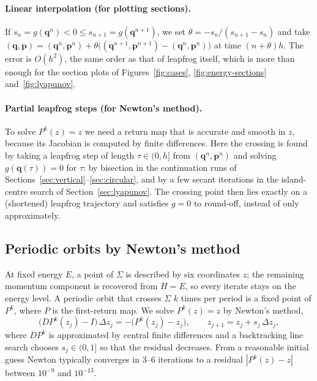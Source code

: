 \documentclass[11pt,a4paper]{article}
\newcommand{\q}{\mathbf{q}}
\newcommand{\p}{\mathbf{p}}
\begin{document}
\paragraph{Linear interpolation (for plotting sections).}
If $s_n=g(\q^n)<0\le s_{n+1}=g(\q^{n+1})$, we set
$\theta=-s_n/(s_{n+1}-s_n)$ and take
$(\q,\p)=(\q^n,\p^n)+\theta\bigl((\q^{n+1},\p^{n+1})-(\q^n,\p^n)\bigr)$ at time
$(n+\theta)h$. The error is $O(h^2)$, the same order as that of leapfrog
itself, which is more than enough for the section plots of
Figures~\ref{fig:cases}, \ref{fig:energy-sections} and~\ref{fig:lyapunov}.

\paragraph{Partial leapfrog steps (for Newton's method).}
To solve $P^k(z)=z$ we need a return map that is accurate and smooth in $z$,
because its Jacobian is computed by finite differences. Here the crossing is
found by taking a leapfrog step of length $\tau\in(0,h]$ from $(\q^n,\p^n)$
and solving $g(\q(\tau))=0$ for $\tau$: by bisection in the continuation runs
of Sections~\ref{sec:vertical}--\ref{sec:circular}, and by a few secant
iterations in the island-centre search of Section~\ref{sec:lyapunov}. The
crossing point then lies exactly on a (shortened) leapfrog trajectory and
satisfies $g=0$ to round-off, instead of only approximately.

\subsection{Periodic orbits by Newton's method}\label{sec:newton}
At fixed energy $E$, a point of $\Sigma$ is described by six coordinates $z$;
the remaining momentum component is recovered from $H=E$, so every iterate
stays on the energy level. A periodic orbit that crosses $\Sigma$ $k$ times per
period is a fixed point of $P^k$, where $P$ is the first-return map. We solve
$P^k(z)=z$ by Newton's method,
\begin{equation}\label{eq:newton}
  \bigl(DP^k(z_j)-I\bigr)\,\Delta z_j=-\bigl(P^k(z_j)-z_j\bigr),\qquad
  z_{j+1}=z_j+s_j\,\Delta z_j,
\end{equation}
where $DP^k$ is approximated by central finite differences and a backtracking
line search chooses $s_j\in(0,1]$ so that the residual decreases. From a
reasonable initial guess Newton typically converges in 3--6 iterations to a
residual $|P^k(z)-z|$ between $10^{-9}$ and $10^{-13}$.
\end{document}
